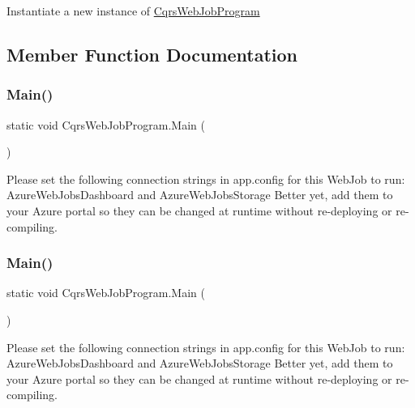 Instantiate a new instance of \hyperlink{classCqrsWebJobProgram}{Cqrs\+Web\+Job\+Program} 



\subsection{Member Function Documentation}
\mbox{\label{classCqrsWebJobProgram_ab11d66be0194de537cb7ae73e74c2181_ab11d66be0194de537cb7ae73e74c2181}} 
\subsubsection{\texorpdfstring{Main()}{Main()}\hspace{0.1cm}{\footnotesize\ttfamily [1/2]}}
{\footnotesize\ttfamily static void Cqrs\+Web\+Job\+Program.\+Main (\begin{DoxyParamCaption}{ }\end{DoxyParamCaption})\hspace{0.3cm}{\ttfamily [static]}}

Please set the following connection strings in app.\+config for this Web\+Job to run\+: Azure\+Web\+Jobs\+Dashboard and Azure\+Web\+Jobs\+Storage Better yet, add them to your Azure portal so they can be changed at runtime without re-\/deploying or re-\/compiling. \mbox{\label{classCqrsWebJobProgram_ab11d66be0194de537cb7ae73e74c2181_ab11d66be0194de537cb7ae73e74c2181}} 
\subsubsection{\texorpdfstring{Main()}{Main()}\hspace{0.1cm}{\footnotesize\ttfamily [2/2]}}
{\footnotesize\ttfamily static void Cqrs\+Web\+Job\+Program.\+Main (\begin{DoxyParamCaption}{ }\end{DoxyParamCaption})\hspace{0.3cm}{\ttfamily [static]}}

Please set the following connection strings in app.\+config for this Web\+Job to run\+: Azure\+Web\+Jobs\+Dashboard and Azure\+Web\+Jobs\+Storage Better yet, add them to your Azure portal so they can be changed at runtime without re-\/deploying or re-\/compiling. 